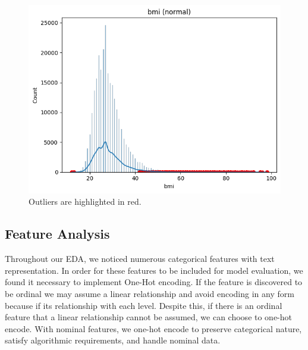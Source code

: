 \documentclass[conference]{IEEEtran}
\begin{document}
    \begin{figure}[h]
        \centering
        \includegraphics[scale=0.39]{outliersBMI.png}
        \caption{Outliers are highlighted in red.}
        \label{fig:outliersBMI}
    \end{figure}

\subsection{Feature Analysis}
Throughout our EDA, we noticed numerous categorical features with text representation. In order for these features to be included for model evaluation, we found it necessary to implement One-Hot encoding. If the feature is discovered to be ordinal we may assume a linear relationship and avoid encoding in any form because if its relationship with each level. Despite this, if there is an ordinal feature that a linear relationship cannot be assumed, we can choose to one-hot encode. With nominal features, we one-hot encode to preserve categorical nature, satisfy algorithmic requirements, and handle nominal data. 
\end{document}

